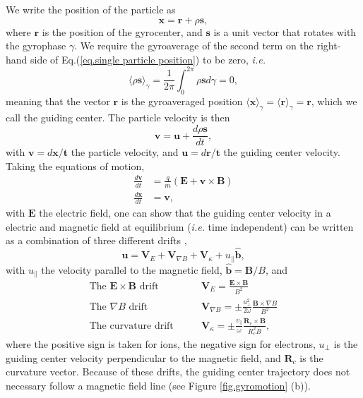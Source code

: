 \documentclass[my_thesis.tex]{subfiles}
\begin{document}
We write the position of the particle as
\begin{equation}
    \mathbf{x} = \mathbf{r} + \rho\mathbf{s},\label{eq.single particle position}
\end{equation}
where $\mathbf{r}$ is the position of the gyrocenter, and $\mathbf{s}$ is a unit vector that rotates with the gyrophase $\gamma$. We require the gyroaverage of the second term on the right-hand side of Eq.(\ref{eq.single particle position}) to be zero, \textit{i.e.}
\begin{equation}
    \langle \rho\mathbf{s}\rangle_\gamma = \frac{1}{2\pi}\int_0^{2\pi} \rho\mathbf{s}d\gamma = 0,
\end{equation}
meaning that the vector $\mathbf{r}$ is the gyroaveraged position $\langle\mathbf{x}\rangle_\gamma = \langle\mathbf{r}\rangle_\gamma = \mathbf{r}$, which we call the guiding center. The particle velocity is then
\begin{equation}
    \mathbf{v} = \mathbf{u} + \frac{d\rho\mathbf{s}}{dt},
\end{equation}
with $\mathbf{v}=d\mathbf{x}/\mathbf{t}$ the particle velocity, and $\mathbf{u}=d\mathbf{r}/\mathbf{t}$ the guiding center velocity. Taking the equations of motion,
\begin{align}
    \frac{d\mathbf{v}}{dt} &= \frac{q}{m}(\mathbf{E}+\mathbf{v}\times\mathbf{B})\\
    \frac{d\mathbf{x}}{dt} &= \mathbf{v},
\end{align}
with $\mathbf{E}$ the electric field, one can show that the guiding center velocity in a electric and magnetic field at equilibrium (\textit{i.e.} time independent) can be written as a combination of three different drifts \citep{freidberg_2007},
\begin{equation}
    \mathbf{u} = \mathbf{V}_E + \mathbf{V}_{\nabla B} + \mathbf{V}_\kappa + u_\parallel \hat{\mathbf{b}},
\end{equation}
with $u_\parallel$ the velocity parallel to the magnetic field, $\hat{\mathbf{b}}=\mathbf{B}/B$, and
\begin{align}
    \text{The $\mathbf{E}\times\mathbf{B}$ drift}\qquad &\mathbf{V}_E = \frac{\mathbf{E}\times\mathbf{B}}{B^2}\\
    \text{The $\nabla B$ drift}\qquad &\mathbf{V}_{\nabla B} = \pm \frac{u_\perp^2}{2\omega}\frac{\mathbf{B}\times\nabla B}{B^2}\\
    \text{The curvature drift}\qquad &\mathbf{V}_\kappa = \pm \frac{v_\parallel}{\omega}\frac{\mathbf{R}_c\times\mathbf{B}}{R_c^2 B},
\end{align}
where the positive sign is taken for ions, the negative sign for electrons, $u_\perp$ is the guiding center velocity perpendicular to the magnetic field, and $\mathbf{R}_c$ is the curvature vector. Because of these drifts, the guiding center trajectory does not necessary follow a magnetic field line (see Figure \ref{fig.gyromotion} (b)).
\end{document}
